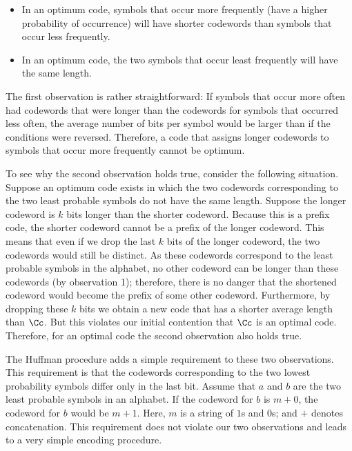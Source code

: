 \begin{itemize}
    \item In an optimum code, symbols that occur more frequently (have a higher probability of occurrence) will have shorter codewords than symbols that occur less frequently.
    
    \item  In an optimum code, the two symbols that occur least frequently will have the same length.
\end{itemize}


 The first observation is rather straightforward: If symbols that occur more often had codewords that were longer than the codewords for symbols that occurred less often, the average number of bits per symbol would be larger than if the conditions were reversed. Therefore, a code that assigns longer codewords to symbols that occur more frequently cannot be optimum.
 
 To see why the second observation holds true, consider the following situation. Suppose an optimum code exists in which the two codewords corresponding to the two least probable symbols do not have the same length. Suppose the longer codeword is $k$ bits longer than the shorter codeword. Because this is a prefix code, the shorter codeword cannot be a prefix of the longer codeword. This means that even if we drop the last $k$ bits of the longer codeword, the two codewords would still be distinct. As these codewords correspond to the least probable symbols in the alphabet, no other codeword can be longer than these codewords (by observation 1); therefore, there is no danger that the shortened codeword would become the prefix of some other codeword. Furthermore, by dropping these $k$ bits we obtain a new code that has a shorter average length than $\Cc$. But this violates our initial contention that $\Cc$ is an optimal code. Therefore, for an optimal code the second observation also holds true.

 The Huffman procedure adds a simple requirement to these two observations. This requirement is that the codewords corresponding to the two lowest probability symbols differ only in the last bit. Assume that $a$ and $b$ are the two least probable symbols in an alphabet. If the codeword for $b$ is $m+0$, the codeword for $b$ would be $m + 1$. Here, $m$ is a string of $1$s and $0$s; and $+$ denotes concatenation. This requirement does not violate our two observations and leads to a very simple encoding procedure.

